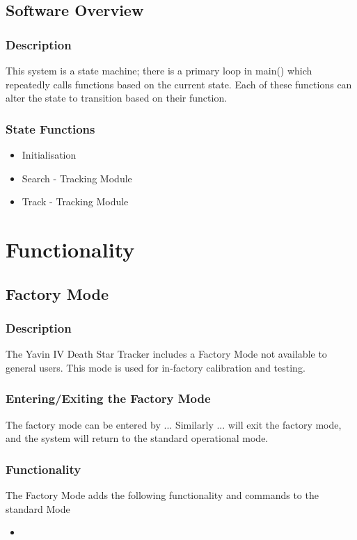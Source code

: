 \documentclass[]{report}
\begin{document}
\chapter{Software Overview}
\section{Description}
This system is a state machine; there is a primary loop in main() which repeatedly calls functions based on the current state. Each of these functions can alter the state to transition based on their function.

\section{State Functions}
\begin{itemize}
	\item Initialisation
	\item Search - Tracking Module
	\item Track - Tracking Module
\end{itemize}

\part{Functionality}
\chapter{Factory Mode}
\section{Description}
The Yavin IV Death Star Tracker includes a Factory Mode not available to general users. This mode is used for in-factory calibration and testing.

\section{Entering/Exiting the Factory Mode}
The factory mode can be entered by ... Similarly ... will exit the factory mode, and the system will return to the standard operational mode.

\section{Functionality}
The Factory Mode adds the following functionality and commands to the standard Mode
\begin{itemize}
	\item
\end{itemize}
\end{document}
